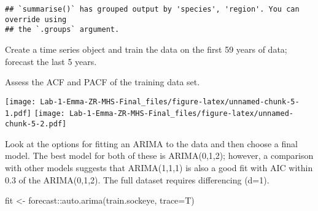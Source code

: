 \documentclass[
]{article}
\newenvironment{Shaded}{\begin{snugshade}}{\end{snugshade}}
\newcommand{\AttributeTok}[1]{\textcolor[rgb]{0.77,0.63,0.00}{#1}}
\newcommand{\DecValTok}[1]{\textcolor[rgb]{0.00,0.00,0.81}{#1}}
\newcommand{\FunctionTok}[1]{\textcolor[rgb]{0.00,0.00,0.00}{#1}}
\newcommand{\NormalTok}[1]{#1}
\newcommand{\OtherTok}[1]{\textcolor[rgb]{0.56,0.35,0.01}{#1}}
\newcommand{\SpecialCharTok}[1]{\textcolor[rgb]{0.00,0.00,0.00}{#1}}
\begin{document}
\begin{verbatim}
## `summarise()` has grouped output by 'species', 'region'. You can override using
## the `.groups` argument.
\end{verbatim}

Create a time series object and train the data on the first 59 years of
data; forecast the last 5 years.

\begin{Shaded}
\end{Shaded}

Assess the ACF and PACF of the training data set.

\texttt{[image: Lab-1-Emma-ZR-MHS-Final\_files/figure-latex/unnamed-chunk-5-1.pdf]}
\texttt{[image: Lab-1-Emma-ZR-MHS-Final\_files/figure-latex/unnamed-chunk-5-2.pdf]}

Look at the options for fitting an ARIMA to the data and then choose a
final model. The best model for both of these is ARIMA(0,1,2); however,
a comparison with other models suggests that ARIMA(1,1,1) is also a good
fit with AIC within 0.3 of the ARIMA(0,1,2). The full dataset requires
differencing (d=1).

\begin{Shaded}
\begin{Highlighting}[]
\NormalTok{fit }\OtherTok{\textless{}{-}}\NormalTok{ forecast}\SpecialCharTok{::}\FunctionTok{auto.arima}\NormalTok{(train.sockeye, }\AttributeTok{trace=}\NormalTok{T)}
\end{Highlighting}
\end{Shaded}
\end{document}
